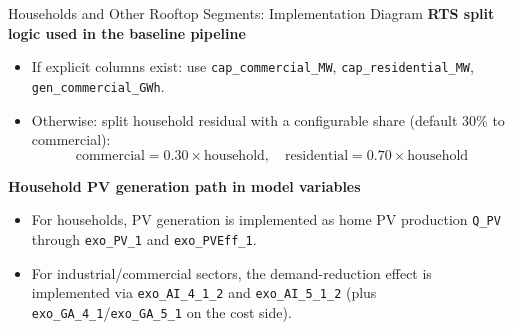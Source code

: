 \documentclass[aspectratio=169]{beamer}
\begin{document}
\begin{frame}{Households and Other Rooftop Segments: Implementation Diagram}
\footnotesize
\textbf{RTS split logic used in the baseline pipeline}
\begin{itemize}
  \item If explicit columns exist: use \texttt{cap\_commercial\_MW}, \texttt{cap\_residential\_MW}, \texttt{gen\_commercial\_GWh}.
  \item Otherwise: split household residual with a configurable share (default 30\% to commercial):
  \[
  \text{commercial}=0.30\times\text{household},\quad \text{residential}=0.70\times\text{household}
  \]
\end{itemize}

\vspace{0.3em}
\textbf{Household PV generation path in model variables}

\begin{center}
\end{center}

\vspace{0.3em}
\begin{itemize}
  \item For households, PV generation is implemented as home PV production \texttt{Q\_PV} through \texttt{exo\_PV\_1} and \texttt{exo\_PVEff\_1}.
  \item For industrial/commercial sectors, the demand-reduction effect is implemented via \texttt{exo\_AI\_4\_1\_2} and \texttt{exo\_AI\_5\_1\_2} (plus \texttt{exo\_GA\_4\_1}/\texttt{exo\_GA\_5\_1} on the cost side).
\end{itemize}
\end{frame}
\end{document}
